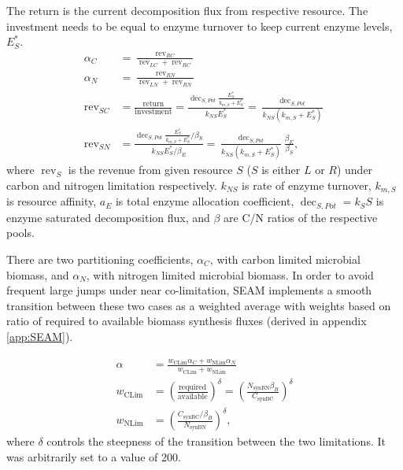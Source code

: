 The return is the current decomposition flux from respective resource. The
investment needs to be equal to enzyme turnover to keep current enzyme levels,
$E_S^*$.
% 
\begin{subequations}
\label{eq:allocRev}
\begin{align}
\alpha_C &= \frac{\operatorname{rev}_{RC}}{\operatorname{rev}_{LC} + \operatorname{rev}_{RC}} \\
\alpha_N &= \frac{\operatorname{rev}_{RN}}{\operatorname{rev}_{LN} + \operatorname{rev}_{RN}} \\
\operatorname{rev}_{SC} &= \frac{\text{return}}{\text{investment}} 
= \frac{\operatorname{dec}_{S,Pot} \frac{E_S^*}{k_{m,S} + E_S^*}} {k_{NS}E_S^*} 
= \frac{\operatorname{dec}_{S,Pot}} {k_{NS}(k_{m,S} + E_S^*)} \\ 
\operatorname{rev}_{SN} &= \frac{\operatorname{dec}_{S,Pot}
\frac{E_S^*}{k_{m,S} + E_S^*} / \beta_S} {k_{NS} E_S^* / \beta_E} 
= \frac{\operatorname{dec}_{S,Pot}}{k_{NS} (k_{m,S} + E_S^*)}
\frac{\beta_E}{\beta_S}
\text{,} 
\end{align}
\end{subequations}
where $\operatorname{rev}_S$ is the revenue from given resource $S$ ($S$ is either $L$ or $R$)
under carbon and nitrogen limitation respectively.
$k_{NS}$ is rate of enzyme turnover, $k_{m,S}$ is resource affinity, $a_E$ is
total enzyme allocation coefficient, $\operatorname{dec}_{S,Pot} = k_S S$ is
enzyme saturated decomposition flux, and $\beta$ are C/N ratios of the
respective pools.

There are two partitioning coefficients, $\alpha_C$, with carbon limited
microbial biomass, and $\alpha_N$, with nitrogen limited microbial biomass. In order to
avoid frequent large jumps under near co-limitation, SEAM implements a smooth
transition between these two cases as a weighted average with weights based
on ratio of required to available biomass synthesis fluxes (derived in
appendix \ref{app:SEAM}).

\begin{subequations}
\label{eq:allocRev}
\begin{align}
\alpha &= \frac{w_{\operatorname{CLim}} \alpha_C + w_{\operatorname{NLim}}
\alpha_N}{w_{\operatorname{CLim}}  + w_{\operatorname{NLim}} } 
\\
w_{\operatorname{CLim}} &= \left( \frac{\text{required}}{\text{available}}
\right)^\delta 
= \left( \frac{ N_{\operatorname{synBN}} \beta_B }{ C_{\operatorname{synBC}} }
\right)^\delta
\\
w_{\operatorname{NLim}} &= \left( \frac{ C_{\operatorname{synBC}} / \beta_B }{
N_{\operatorname{synBN}} } \right)^\delta
\text{,} 
\end{align}
\end{subequations}
where $\delta$ controls the steepness of the transition between the two
limitations. It was arbitrarily set to a value of 200.



